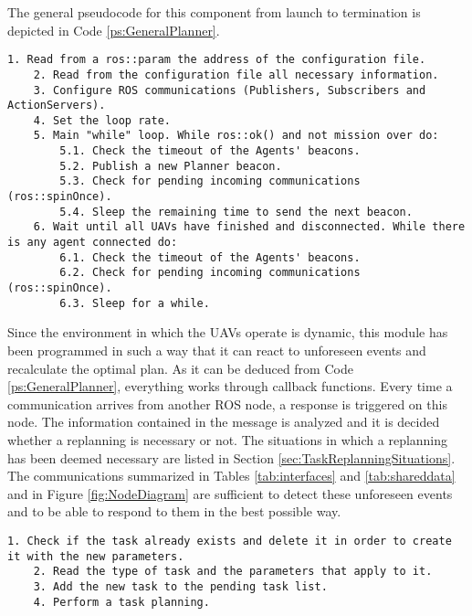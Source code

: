 The general pseudocode for this component from launch to termination is depicted in Code \ref{ps:GeneralPlanner}.

\begin{lstlisting}[caption={General operation of \emph{High-Level Planner}'s code}, breaklines=true, label=ps:GeneralPlanner]
	1. Read from a ros::param the address of the configuration file.
	2. Read from the configuration file all necessary information.
	3. Configure ROS communications (Publishers, Subscribers and ActionServers).
	4. Set the loop rate.
	5. Main "while" loop. While ros::ok() and not mission over do:
		5.1. Check the timeout of the Agents' beacons.
		5.2. Publish a new Planner beacon.
		5.3. Check for pending incoming communications (ros::spinOnce).
		5.4. Sleep the remaining time to send the next beacon.
	6. Wait until all UAVs have finished and disconnected. While there is any agent connected do:
		6.1. Check the timeout of the Agents' beacons.
		6.2. Check for pending incoming communications (ros::spinOnce).
		6.3. Sleep for a while.
\end{lstlisting}

Since the environment in which the \glspl{UAV} operate is dynamic, this module has been programmed in such a way that it can react to unforeseen events and recalculate the optimal plan. As it can be deduced from Code \ref{ps:GeneralPlanner}, everything works through callback functions. Every time a communication arrives from another ROS node, a response is triggered on this node. The information contained in the message is analyzed and it is decided whether a replanning is necessary or not. The situations in which a replanning has been deemed necessary are listed in Section \ref{sec:TaskReplanningSituations}. The communications summarized in Tables \ref{tab:interfaces} and \ref{tab:shareddata} and in Figure \ref{fig:NodeDiagram} are sufficient to detect these unforeseen events and to be able to respond to them in the best possible way.

\begin{lstlisting}[caption={Task callback pseudocode}, breaklines=true, label=ps:IncomingTask]
	1. Check if the task already exists and delete it in order to create it with the new parameters.
	2. Read the type of task and the parameters that apply to it.
	3. Add the new task to the pending task list.
	4. Perform a task planning.
\end{lstlisting}

